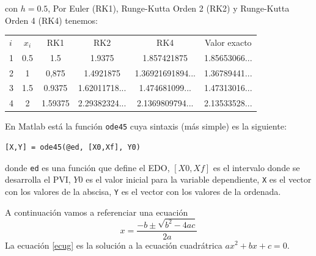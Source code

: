 \documentclass[12pt,letterpaper]{article}
\begin{document}
con \( h = 0.5 \),
Por Euler (RK1), Runge-Kutta Orden 2 (RK2) y Runge-Kutta Orden 4 (RK4) tenemos:

\begin{table}[h]
\centering
\begin{tabular}{lccccc}
 \( i \) &\( x_i \) & RK1 & RK2 & RK4 & Valor exacto\\
 1&0.5 & 1.5& 1.9375& 1.857421875& 1.85653066...\\
 2&1 & 0,875& 1.4921875& 1.36921691894...& 1.36789441...\\
 3&1.5 & 0.9375& 1.62011718...& 1.474681099...& 1.47313016...\\
 4&2 & 1.59375& 2.29382324...& 2.1369809794...& 2.13533528...\\
\end{tabular}
\end{table}

En Matlab está la función \texttt{ode45} cuya sintaxis (más simple) es la siguiente:

\begin{verbatim}
[X,Y] = ode45(@ed, [X0,Xf], Y0)
\end{verbatim}

donde \texttt{ed} es una función que define el EDO, \([X0,Xf]\) es el intervalo donde se desarrolla el PVI, 
\( Y0 \) es el valor inicial para la variable dependiente,
\texttt{X} es el vector con los valores de la abscisa, 
\texttt{Y} es el vector con los valores de la ordenada.



A continuación vamos a referenciar una ecuación
\begin{equation}\label{ecug}
    x=\frac{-b\pm\sqrt{b^2-4ac}}{2a}
\end{equation}
La ecuación \eqref{ecug} es la solución a la ecuación cuadrátrica $ax^2+bx+c=0$.
\end{document}
